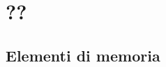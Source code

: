 \documentclass[\main/main.tex]{subfiles}
\begin{document}
\section{??}
\subsection{Elementi di memoria}
\end{document}
